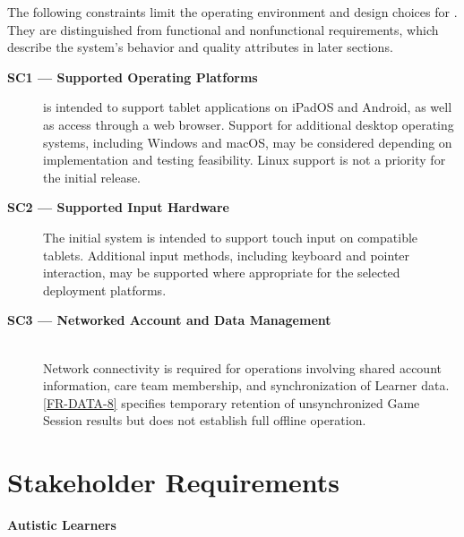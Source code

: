 \documentclass[12pt]{article}
\begin{document}
The following constraints limit the operating environment and design choices for
\progname{}. They are distinguished from functional and nonfunctional
requirements, which describe the system's behavior and quality attributes in
later sections.

\begin{description}
\item[\textbf{SC1 --- Supported Operating Platforms}]\hypertarget{SC1}{}
\progname{} is intended to support tablet applications on iPadOS and Android, as
well as access through a web browser. Support for additional desktop operating
systems, including Windows and macOS, may be considered depending on
implementation and testing feasibility. Linux support is not a priority for the
initial release.
\item[\textbf{SC2 --- Supported Input Hardware}]\hypertarget{SC2}{}
The initial system is intended to support touch input on compatible tablets.
Additional input methods, including keyboard and pointer interaction, may be
supported where appropriate for the selected deployment platforms.
\item[\textbf{SC3 --- Networked Account and Data Management}]\hypertarget{SC3}{}\hfill\\
Network connectivity is required for operations involving shared account
information, care team membership, and synchronization of Learner data.
\ref{FR-DATA-8} specifies temporary retention of unsynchronized Game Session
results but does not establish full offline operation.
\end{description}

\section{Stakeholder Requirements}
\label{sec:stakeholder-requirements}


\noindent \textbf{Autistic Learners}
\end{document}
